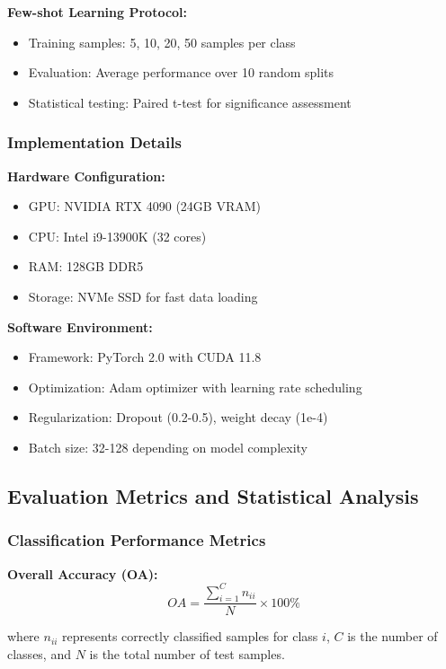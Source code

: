 \documentclass[journal]{IEEEtran}
\begin{document}
\textbf{Few-shot Learning Protocol:}
\begin{itemize}
\item Training samples: 5, 10, 20, 50 samples per class
\item Evaluation: Average performance over 10 random splits
\item Statistical testing: Paired t-test for significance assessment
\end{itemize}

\subsubsection{Implementation Details}

\textbf{Hardware Configuration:}
\begin{itemize}
\item GPU: NVIDIA RTX 4090 (24GB VRAM)
\item CPU: Intel i9-13900K (32 cores)
\item RAM: 128GB DDR5
\item Storage: NVMe SSD for fast data loading
\end{itemize}

\textbf{Software Environment:}
\begin{itemize}
\item Framework: PyTorch 2.0 with CUDA 11.8
\item Optimization: Adam optimizer with learning rate scheduling
\item Regularization: Dropout (0.2-0.5), weight decay (1e-4)
\item Batch size: 32-128 depending on model complexity
\end{itemize}

\subsection{Evaluation Metrics and Statistical Analysis}

\subsubsection{Classification Performance Metrics}

\textbf{Overall Accuracy (OA):}
\begin{equation}
OA = \frac{\sum_{i=1}^{C} n_{ii}}{N} \times 100\%
\end{equation}

where $n_{ii}$ represents correctly classified samples for class $i$, $C$ is the number of classes, and $N$ is the total number of test samples.
\end{document}
